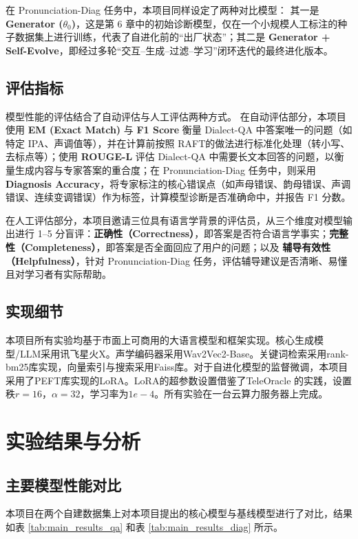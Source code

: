 在 Pronunciation-Diag 任务中，本项目同样设定了两种对比模型：  
其一是 \textbf{Generator ($\theta_0$)}，这是第 6 章中的初始诊断模型，仅在一个小规模人工标注的种子数据集上进行训练，代表了自进化前的“出厂状态”；其二是 \textbf{Generator + Self-Evolve}，即经过多轮“交互–生成–过滤–学习”闭环迭代的最终进化版本。

\subsection{评估指标}

模型性能的评估结合了自动评估与人工评估两种方式。  
在自动评估部分，本项目使用 \textbf{EM (Exact Match)} 与 \textbf{F1 Score} 衡量 Dialect-QA 中答案唯一的问题（如特定 IPA、声调值等），并在计算前按照 RAFT的做法进行标准化处理（转小写、去标点等）；使用 \textbf{ROUGE-L} 评估 Dialect-QA 中需要长文本回答的问题，以衡量生成内容与专家答案的重合度；在 Pronunciation-Diag 任务中，则采用 \textbf{Diagnosis Accuracy}，将专家标注的核心错误点（如声母错误、韵母错误、声调错误、连续变调错误）作为标签，计算模型诊断是否准确命中，并报告 F1 分数。

在人工评估部分，本项目邀请三位具有语言学背景的评估员，从三个维度对模型输出进行 1–5 分盲评：\textbf{正确性（Correctness）}，即答案是否符合语言学事实；\textbf{完整性（Completeness）}，即答案是否全面回应了用户的问题；以及 \textbf{辅导有效性（Helpfulness）}，针对 Pronunciation-Diag 任务，评估辅导建议是否清晰、易懂且对学习者有实际帮助。
\subsection{实现细节}
本项目所有实验均基于市面上可商用的大语言模型和框架实现。核心生成模型/LLM采用讯飞星火X。声学编码器采用Wav2Vec2-Base。关键词检索采用rank-bm25库实现，向量索引与搜索采用Faiss库。对于自进化模型的监督微调，本项目采用了PEFT库实现的LoRA。LoRA的超参数设置借鉴了TeleOracle 的实践，设置秩$r=16$，$\alpha=32$，学习率为$1e-4$。所有实验在一台云算力服务器上完成。

\section{实验结果与分析}

\subsection{主要模型性能对比}
本项目在两个自建数据集上对本项目提出的核心模型与基线模型进行了对比，结果如表 \ref{tab:main_results_qa} 和表 \ref{tab:main_results_diag} 所示。

